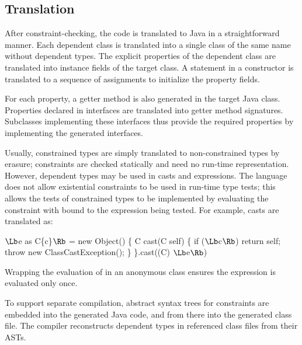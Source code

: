 


\subsection{Translation}

After constraint-checking, the \Xten{} code is translated to
Java in a straightforward manner.  Each dependent class
is translated into a single class of the same name without dependent
types. The explicit properties of the dependent class are translated
into  instance fields of the target class.
A  statement in a constructor is translated to a
sequence of assignments to initialize the property fields.

For each property, a getter method is also generated in the
target Java class.
Properties declared in interfaces are translated into getter
method signatures.  Subclasses implementing these interfaces
thus provide the required properties by implementing the
generated interfaces.

Usually, constrained types are simply translated to
non-constrained types by erasure; constraints are checked
statically and need no run-time representation.
However, dependent types may be used in casts
and  expressions.  The language does not allow
existential constraints to be used in run-time type tests; this
allows the tests of constrained types to be implemented
by evaluating the constraint with
 bound to the expression being tested.
For example, casts are translated as:
\begin{code}
  $\Lb$e as C\{c\}$\Rb$ = 
    new Object() \{
      C cast(C self) \{
        if ($\Lb$c$\Rb$) return self;
        throw new ClassCastException(); \}
    \}.cast((C) $\Lb$e$\Rb$)
\end{code}
\noindent Wrapping the evaluation of  in an anonymous class
ensures the expression  is evaluated only once.

To support separate compilation, abstract syntax trees for
constraints are embedded into the generated Java code, and from
there into the generated class file.  The compiler reconstructs
dependent types in referenced class files from their ASTs.

